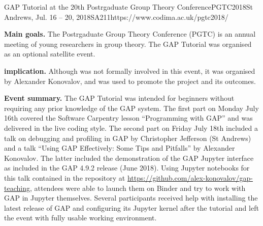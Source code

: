 \begin{event}{GAP Tutorial at the 20th Postrgaduate Group Theory Conference}{PGTC2018}{St Andrews, Jul. 16 -- 20, 2018}{SA}{21}{1}{https://www.codima.ac.uk/pgtc2018/}

\textbf{Main goals.} The Postrgaduate Group Theory Conference (PGTC) is an annual meeting of
young researchers in group theory. The GAP Tutorial was organised as an optional satellite event.

\textbf{\ODK implication.} Although \ODK was not formally involved in this event, it was
organised by Alexander Konovalov, and was used to promote the project and its outcomes.

\textbf{Event summary.} The GAP Tutorial was intended for beginners without requiring
any prior knowledge of the GAP system. The first part on Monday July 16th covered
the Software Carpentry lesson ``Programming with GAP'' and was delivered in the live
coding style. The second part on Friday July 18th included a talk on debugging and
profiling in GAP by Christopher Jefferson (St Andrews) and a talk
``Using GAP Effectively: Some Tips and Pitfalls'' by Alexander Konovalov. The latter
included the demonstration of the GAP Jupyter interface as included in the GAP 4.9.2
release (June 2018). Using Jupyter notebooks for this talk contained in the repository
at \url{https://github.com/alex-konovalov/gap-teaching}, attendees were able to launch
them on Binder and try to work with GAP in Jupyter themselves. Several participants
received help with installing the latest release of GAP and configuring its Jupyter
kernel after the tutorial and left the event with fully usable working environment.

\end{event}
